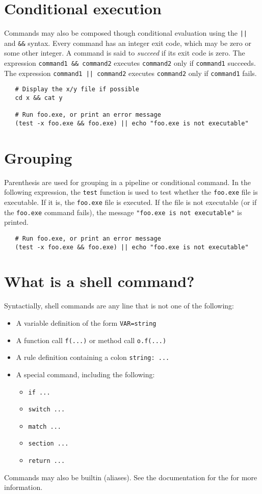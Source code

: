 \section{Conditional execution}

Commands may also be composed though conditional evaluation using the \verb+||+ and \verb+&&+
syntax.  Every command has an integer exit code, which may be zero or some other integer.  A command
is said to \emph{succeed} if its exit code is zero.  The expression \verb+command1 && command2+
executes \verb+command2+ only if \verb+command1+ succeeds.  The expression
\verb+command1 || command2+ executes \verb+command2+ only if \verb+command1+ fails.

\begin{verbatim}
   # Display the x/y file if possible
   cd x && cat y

   # Run foo.exe, or print an error message
   (test -x foo.exe && foo.exe) || echo "foo.exe is not executable"
\end{verbatim}

\section{Grouping}

Parenthesis are used for grouping in a pipeline or conditional command.  In the following
expression, the \verb+test+ function is used to test whether the \verb+foo.exe+ file is executable.
If it is, the \verb+foo.exe+ file is executed.  If the file is not executable (or if the
\verb+foo.exe+ command fails), the message \verb+"foo.exe is not executable"+ is printed.

\begin{verbatim}
   # Run foo.exe, or print an error message
   (test -x foo.exe && foo.exe) || echo "foo.exe is not executable"
\end{verbatim}

\section{What is a shell command?}

Syntactially, shell commands are any line that is not one of the following:

\begin{itemize}
\item A variable definition of the form \verb+VAR=string+
\item A function call \verb+f(...)+ or method call \verb+o.f(...)+
\item A rule definition containing a colon \verb+string: ...+
\item A special command, including the following:
\begin{itemize}
\item \verb+if ...+
\item \verb+switch ...+
\item \verb+match ...+
\item \verb+section ...+
\item \verb+return ...+
\end{itemize}
\end{itemize}

Commands may also be builtin (aliases).  See the documentation for the
 for more information.

